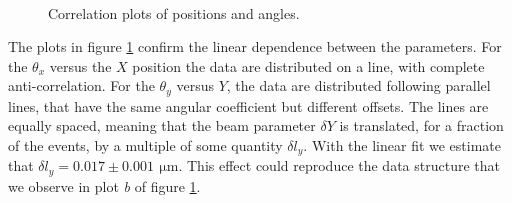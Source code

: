 \begin{figure}[!ht]
\centering
\captionsetup[subfloat]{farskip=2pt,captionskip=1pt}
 \\
\caption{Correlation plots of positions and angles.}
\label{fig:CorrelationBeam}
\end{figure}

The plots in figure \ref{fig:CorrelationBeam} confirm the linear dependence between the parameters. For the $\theta_{x}$ versus the $X$ position the data are distributed on a line, with complete anti-correlation. For the $\theta_{y}$ versus $Y$, the data are distributed following parallel lines, that have the same angular coefficient but different offsets. The lines are equally spaced, meaning that the beam parameter $\delta Y$ is translated, for a fraction of the events, by a multiple of some quantity $\delta l_{y}$. With the linear fit we estimate that $\delta l_{y} = 0.017 \pm 0.001 \, \SI{}{\micro \meter}$. This effect could reproduce the data structure that we observe in plot \textit{b} of figure \ref{fig:CorrelationBeam}. 

